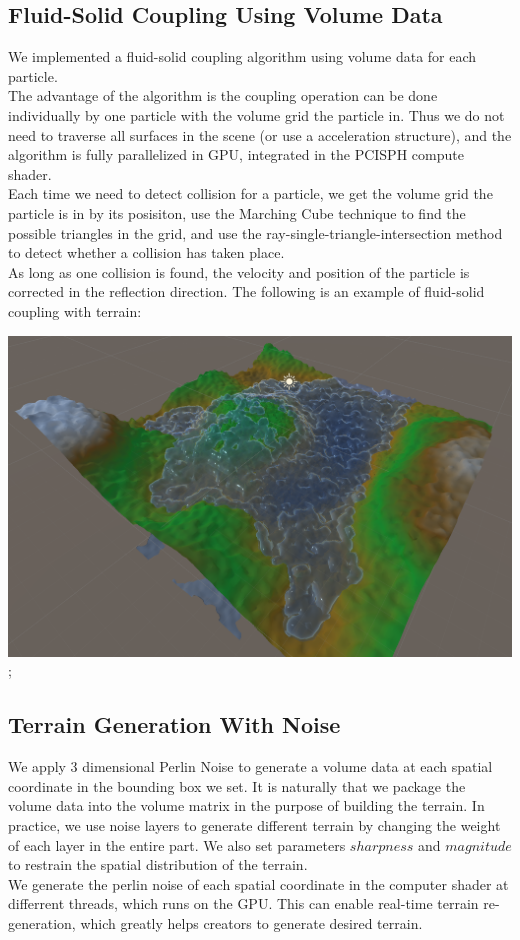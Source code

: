 \documentclass[acmtog]{acmart}
\begin{document}
\subsection{Fluid-Solid Coupling Using Volume Data}
We implemented a fluid-solid coupling algorithm using volume data for each particle. \\
The advantage of the algorithm is the coupling operation can be done individually by one particle with the volume grid the particle in. Thus we do not need to traverse all surfaces in the scene (or use a acceleration structure), and the algorithm is fully parallelized in GPU, integrated in the PCISPH compute shader.\\
Each time we need to detect collision for a particle, we get the volume grid the particle is in by its posisiton, use the Marching Cube technique to find the possible triangles in the grid, and use the ray-single-triangle-intersection method to detect whether a collision has taken place.\\
As long as one collision is found, the velocity and position of the particle is corrected in the reflection direction.
The following is an example of fluid-solid coupling with terrain:
\begin{center}
    \includegraphics[width=0.9\linewidth]{../Images/Coupling.PNG};
\end{center}

\subsection{Terrain Generation With Noise}
We apply 3 dimensional Perlin Noise to generate a volume data at each spatial coordinate in the bounding box we set.
It is naturally that we package the volume data into the volume matrix in the purpose of building the terrain.
In practice, we use noise layers to generate different terrain by changing the weight of each layer in the entire part.
We also set parameters $sharpness$ and $magnitude$ to restrain the spatial distribution of the terrain. \\
We generate the perlin noise of each spatial coordinate in the computer shader at differrent threads, which runs on the GPU. This can enable real-time terrain re-generation, which greatly helps creators to generate desired terrain.\\
\end{document}
